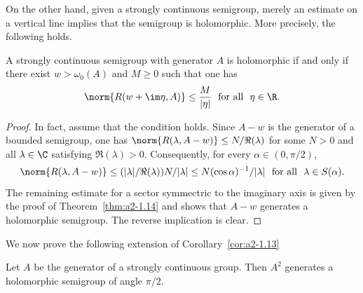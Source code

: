 On the other hand, given a strongly continuous semigroup, merely an estimate on a vertical line implies that the semigroup is holomorphic.
More precisely, the following holds.
\begin{corollary*}\label{cor:a2-1.14-kgk}
A strongly continuous semigroup with generator $A$ is holomorphic if and only if there exist $w > \omega_{0}(A)$ and $M \geq 0$ such that one has
\[
    \norm{R(w+\im\eta,A)} \leq \frac{M}{|\eta|}  \ \text{ for all }\ \eta \in \R.
\]
\end{corollary*}

\begin{proof}
In fact, assume that the condition holds.
Since $A-w$ is the generator of a bounded semigroup, one has 
$\norm{R(\lambda,A-w)} \leq N/\Re(\lambda)$ for some $N > 0$ and all $\lambda \in \C$ 
satisfying $\Re(\lambda) > 0$.
Consequently, for every $\alpha \in (0,\pi/2)$, 
\[
\norm{R(\lambda,A-w)} \leq (|\lambda|/\Re(\lambda))N/|\lambda| \leq N(\cos\alpha)^{-1}/|\lambda| 
 \ \text{ for all }\ \lambda \in S(\alpha) .
\]
The remaining estimate for a sector symmectric to the imaginary axis is given by the proof of Theorem~\ref{thm:a2-1.14}    
and shows that $A-w$ generates a holomorphic semigroup.
The reverse implication is clear.
\end{proof}

We now prove the following extension of Corollary~\ref{cor:a2-1.13}  

\begin{theorem}\label{thm:a2-1.15}
Let $A$ be the generator of a strongly continuous group.
Then $A^2$ generates a holomorphic semigroup of angle $\pi/2$.
\end{theorem}

